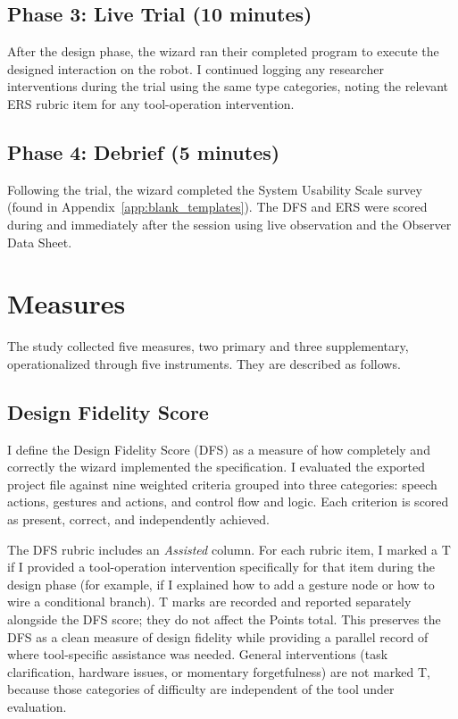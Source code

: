\subsection{Phase 3: Live Trial (10 minutes)}

After the design phase, the wizard ran their completed program to execute the designed interaction on the robot. I continued logging any researcher interventions during the trial using the same type categories, noting the relevant ERS rubric item for any tool-operation intervention.

\subsection{Phase 4: Debrief (5 minutes)}

Following the trial, the wizard completed the System Usability Scale survey (found in Appendix~\ref{app:blank_templates}). The DFS and ERS were scored during and immediately after the session using live observation and the Observer Data Sheet.

\section{Measures}
\label{sec:measures}

The study collected five measures, two primary and three supplementary, operationalized through five instruments. They are described as follows.

\subsection{Design Fidelity Score}

I define the Design Fidelity Score (DFS) as a measure of how completely and correctly the wizard implemented the specification. I evaluated the exported project file against nine weighted criteria grouped into three categories: speech actions, gestures and actions, and control flow and logic. Each criterion is scored as present, correct, and independently achieved.

The DFS rubric includes an \emph{Assisted} column. For each rubric item, I marked a T if I provided a tool-operation intervention specifically for that item during the design phase (for example, if I explained how to add a gesture node or how to wire a conditional branch). T marks are recorded and reported separately alongside the DFS score; they do not affect the Points total. This preserves the DFS as a clean measure of design fidelity while providing a parallel record of where tool-specific assistance was needed. General interventions (task clarification, hardware issues, or momentary forgetfulness) are not marked T, because those categories of difficulty are independent of the tool under evaluation.

